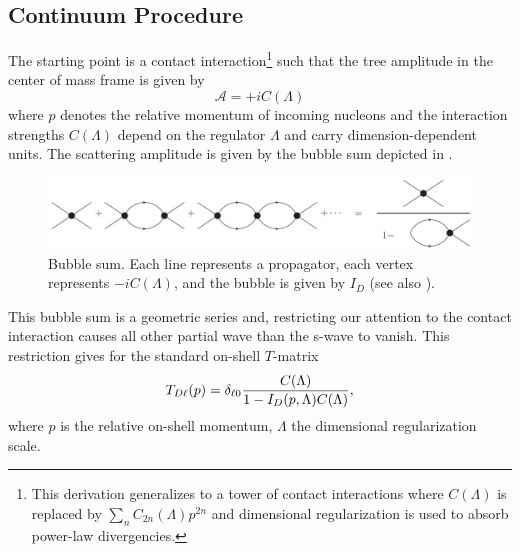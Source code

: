 \subsection{Continuum Procedure}\label{sec:continuum}
The starting point is a contact interaction\footnote{This derivation generalizes to a tower of contact interactions where $C(\Lambda)$ is replaced by $\sum_n C_{2n}(\Lambda) p^{2n}$ \cite{Kaplan:1998we,Beane:2003da} and dimensional regularization is used to absorb power-law divergencies.} such that the tree amplitude in the center of mass frame is given by
\begin{equation}
    \mathcal A = + i C(\Lambda)
\end{equation}
where $p$ denotes the relative momentum of incoming nucleons and the interaction strengths $ C(\Lambda)$ depend on the regulator $\Lambda$ and carry dimension-dependent units.
The scattering amplitude is given by the bubble sum depicted in .

\begin{figure}[ht!]
\center
\includegraphics[width=\columnwidth]{figure/bubbleSum.pdf}
\caption{Bubble sum. Each line represents a propagator, each vertex represents $-i C(\Lambda)$, and the bubble is given by $I_D$ (see also ).\label{fig:bubbleSum}}
\end{figure}

This bubble sum is a geometric series and, restricting our attention to the contact interaction causes all other partial wave than the s-wave to vanish.
This restriction gives for the standard on-shell $T$-matrix
\begin{equation}\label{eq:T matrix}
T_{D\ell}(p) = \delta_{\ell 0} \frac{C(\Lambda)}{1-I_D(p,\Lambda) C(\Lambda)},
\end{equation}
where $p$ is the relative on-shell momentum, $\Lambda$ the dimensional regularization scale.

